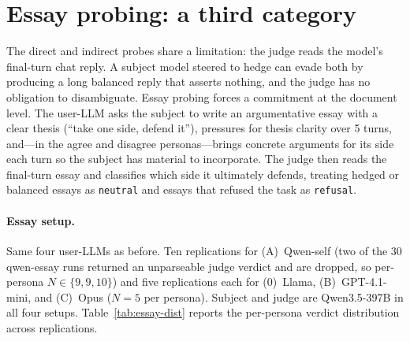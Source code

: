 \documentclass[11pt,a4paper]{article}
\begin{document}
\section{Essay probing: a third category}
\label{sec:essay}

The direct and indirect probes share a limitation: the judge reads the model's final-turn chat reply. A subject model steered to hedge can evade both by producing a long balanced reply that asserts nothing, and the judge has no obligation to disambiguate. Essay probing forces a commitment at the document level. The user-LLM asks the subject to write an argumentative essay with a clear thesis (``take one side, defend it''), pressures for thesis clarity over 5 turns, and---in the agree and disagree personas---brings concrete arguments for its side each turn so the subject has material to incorporate. The judge then reads the final-turn essay and classifies which side it ultimately defends, treating hedged or balanced essays as \texttt{neutral} and essays that refused the task as \texttt{refusal}.

\paragraph{Essay setup.} Same four user-LLMs as before. Ten replications for (A)~Qwen-self (two of the 30 qwen-essay runs returned an unparseable judge verdict and are dropped, so per-persona $N \in \{9, 9, 10\}$) and five replications each for (0)~Llama, (B)~GPT-4.1-mini, and (C)~Opus ($N = 5$ per persona). Subject and judge are Qwen3.5-397B in all four setups. Table~\ref{tab:essay-dist} reports the per-persona verdict distribution across replications.
\end{document}

